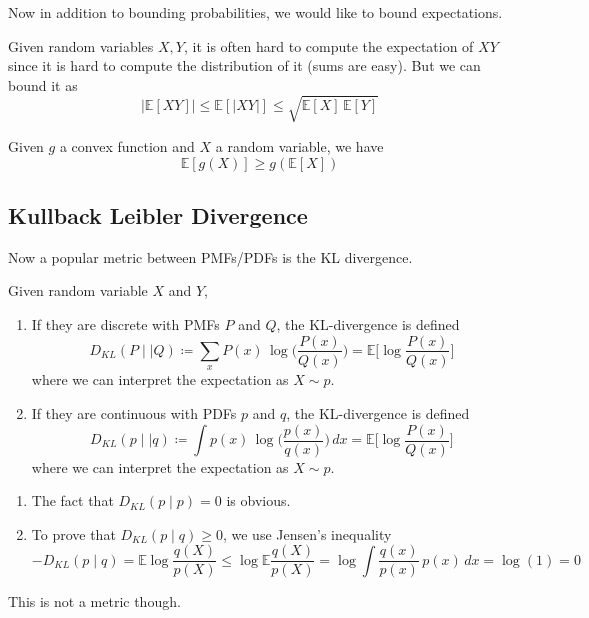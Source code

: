   Now in addition to bounding probabilities, we would like to bound expectations. 

  \begin{theorem}
  Given random variables $X, Y$, it is often hard to compute the expectation of $X Y$ since it is hard to compute the distribution of it (sums are easy). But we can bound it as 
  \[|\mathbb{E}[XY]| \leq \mathbb{E}[ |XY| ] \leq \sqrt{\mathbb{E}[X] \, \mathbb{E}[Y]}\]
  \end{theorem}

  \begin{theorem}
  Given $g$ a convex function and $X$ a random variable, we have 
  \[\mathbb{E}[ g(X)] \geq g (\mathbb{E}[X])\]
  \end{theorem}

  \subsection{Kullback Leibler Divergence}

  Now a popular metric between PMFs/PDFs is the KL divergence. 

  \begin{definition}
  Given random variable $X$ and $Y$, 
  \begin{enumerate}
      \item If they are discrete with PMFs $P$ and $Q$, the KL-divergence is defined 
      \[D_{KL} (P \mid\mid Q) \coloneqq \sum_{x} P(x) \, \log \bigg(\frac{P(x)}{Q(x)} \bigg) = \mathbb{E} \bigg[ \log \frac{P(x)}{Q(x)} \bigg] \]
      where we can interpret the expectation as $X \sim p$. 
      \item If they are continuous with PDFs $p$ and $q$, the KL-divergence is defined 
      \[D_{KL} (p \mid\mid q) \coloneqq \int p(x) \, \log \bigg( \frac{p(x)}{q(x)} \bigg)\,dx = \mathbb{E} \bigg[ \log \frac{P(x)}{Q(x)} \bigg] \]
      where we can interpret the expectation as $X \sim p$. 
  \end{enumerate}
  \end{definition}

  \begin{enumerate}
      \item The fact that $D_{KL} (p \mid p) = 0$ is obvious. 
      \item To prove that $D_{KL} (p \mid q) \geq 0$, we use Jensen's inequality
      \[-D_{KL} (p \mid q) = \mathbb{E} \log \frac{q(X)}{p(X)} \leq \log \mathbb{E} \frac{q(X)}{p(X)} = \log \int \frac{q(x)}{p(x)} \, p(x) \, dx = \log(1) = 0\]
  \end{enumerate}
  This is not a metric though. 

